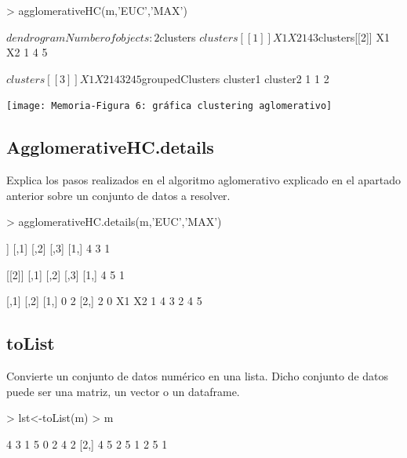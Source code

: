 \documentclass [a4paper] {article}
\begin{document}
\begin{Schunk}
\begin{Sinput}
> agglomerativeHC(m,'EUC','MAX')
\end{Sinput}
\begin{Soutput}
$dendrogram
Number of objects: 2 


$clusters
$clusters[[1]]
  X1 X2
1  4  3

$clusters[[2]]
  X1 X2
1  4  5

$clusters[[3]]
  X1 X2
1  4  3
2  4  5


$groupedClusters
  cluster1 cluster2
1        1        2
\end{Soutput}
\end{Schunk}
\texttt{[image: Memoria-Figura 6: gráfica clustering aglomerativo]}

\subsection{AgglomerativeHC.details}

Explica los pasos realizados en el algoritmo aglomerativo explicado en el apartado anterior sobre un conjunto de datos a resolver.

\begin{Schunk}
\begin{Sinput}
> agglomerativeHC.details(m,'EUC','MAX')
\end{Sinput}
\begin{Soutput}
[[1]]
     [,1] [,2] [,3]
[1,]    4    3    1

[[2]]
     [,1] [,2] [,3]
[1,]    4    5    1

     [,1] [,2]
[1,]    0    2
[2,]    2    0
  X1 X2
1  4  3
2  4  5
\end{Soutput}
\end{Schunk}

\subsection{toList}

Convierte un conjunto de datos numérico en una lista. Dicho conjunto de datos puede ser una matriz, un vector o un dataframe.

\begin{Schunk}
\begin{Sinput}
> lst<-toList(m)
> m
\end{Sinput}
\begin{Soutput}
     [,1] [,2] [,3] [,4] [,5] [,6] [,7] [,8]
[1,]    4    3    1    5    0    2    4    2
[2,]    4    5    2    5    1    2    5    1
\end{Soutput}
\end{Schunk}
\end{document}
